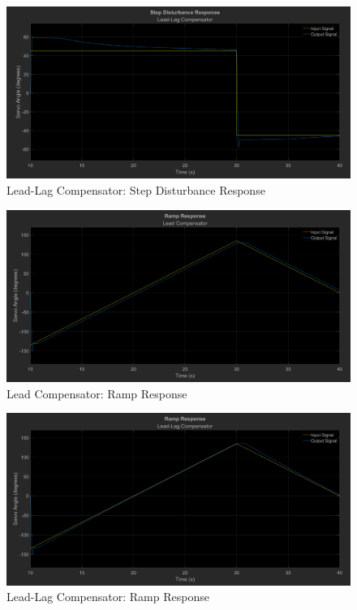\documentclass[12pt]{article}
\begin{document}
\begin{figure}[h!]
    \centering
    \includegraphics[width=\textwidth]{dist_leadlag}
    \caption{\label{fig:dist_leadlag}Lead-Lag Compensator: Step Disturbance Response}
\end{figure}

\begin{figure}[h!]
	\centering
    \includegraphics[width=\textwidth]{ramp_lead}
    \caption{\label{fig:ramp_lead}Lead Compensator: Ramp Response}
\end{figure}

\begin{figure}[h!]
    \centering
    \includegraphics[width=\textwidth]{ramp_leadlag}
    \caption{\label{fig:ramp_leadlag}Lead-Lag Compensator: Ramp Response}
\end{figure}
\end{document}
